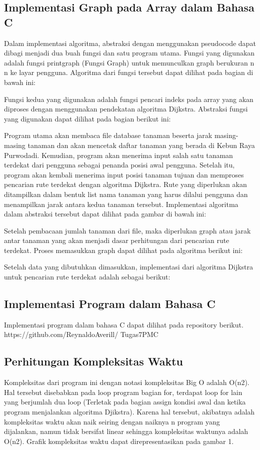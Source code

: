 \documentclass[conference]{IEEEtran}
\begin{document}
\subsection{Implementasi Graph pada Array dalam Bahasa C}
Dalam implementasi algoritma, abstraksi dengan menggunakan
pseudocode dapat dibagi menjadi dua buah fungsi dan
satu program utama. Fungsi yang digunakan adalah fungsi
printgraph (Fungsi Graph) untuk memunculkan graph berukuran
n  n ke layar pengguna. Algoritma dari fungsi tersebut
dapat dilihat pada bagian di bawah ini:


Fungsi kedua yang digunakan adalah fungsi pencari indeks
pada array yang akan diproses dengan menggunakan pendekatan
algoritma Dijkstra. Abstraksi fungsi yang digunakan
dapat dilihat pada bagian berikut ini:


Program utama akan membaca file database tanaman
beserta jarak masing-masing tanaman dan akan mencetak
daftar tanaman yang berada di Kebun Raya Purwodadi.
Kemudian, program akan menerima input salah satu tanaman
terdekat dari pengguna sebagai penanda posisi awal pengguna.
Setelah itu, program akan kembali menerima input posisi
tanaman tujuan dan memproses pencarian rute terdekat dengan
algoritma Dijkstra. Rute yang diperlukan akan ditampilkan
dalam bentuk list nama tanaman yang harus dilalui pengguna
dan menampilkan jarak antara kedua tanaman tersebut.
Implementasi algoritma dalam abstraksi tersebut dapat dilihat
pada gambar di bawah ini:


Setelah pembacaan jumlah tanaman dari file, maka diperlukan
graph atau jarak antar tanaman yang akan menjadi dasar
perhitungan dari pencarian rute terdekat. Proses memasukkan
graph dapat dilihat pada algoritma berikut ini:


Setelah data yang dibutuhkan dimasukkan, implementasi
dari algoritma Dijkstra untuk pencarian rute terdekat adalah
sebagai berikut:


\subsection{Implementasi Program dalam Bahasa C}
Implementasi program dalam bahasa C dapat dilihat
pada repository berikut. https://github.com/ReynaldoAverill/
Tugas7PMC

\subsection{Perhitungan Kompleksitas Waktu}
Kompleksitas dari program ini dengan notasi kompleksitas
Big O adalah O(n2). Hal tersebut disebabkan pada loop
program bagian for, terdapat loop for lain yang berjumlah
dua loop (Terletak pada bagian assign kondisi awal dan ketika
program menjalankan algoritma Djikstra). Karena hal tersebut,
akibatnya adalah kompleksitas waktu akan naik seiring dengan
naiknya n program yang dijalankan, namun tidak bersifat
linear sehingga kompleksitas waktunya adalah O(n2). Grafik
kompleksitas waktu dapat direpresentasikan pada gambar 1.
\end{document}
